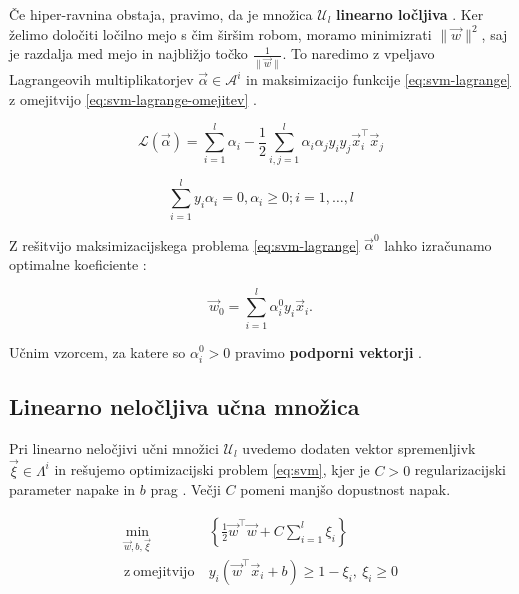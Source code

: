 Če hiper-ravnina obstaja, pravimo, da je množica $\mathcal{U}_l$ \textbf{linearno ločljiva} \cite{chapelle1999support}. Ker želimo določiti ločilno mejo s čim širšim robom, moramo minimizrati $\|\vec{w}\|^2$, saj je razdalja med mejo in najbližjo točko $\frac{1}{\|\vec{w}\|}$. To naredimo z vpeljavo Lagrangeovih multiplikatorjev $\vec{\alpha} \in \mathcal{A}^i$ in maksimizacijo funkcije \eqref{eq:svm-lagrange} z omejitvijo \eqref{eq:svm-lagrange-omejitev} \cite{chapelle1999support}.

\begin{equation}\label{eq:svm-lagrange}
	\mathcal{L}(\vec{\alpha}) = \sum_{i=1}^l \alpha_i - \frac{1}{2}\sum_{i,j=1}^l \alpha_i\alpha_j y_i y_j \vec{x}_i^\top\vec{x}_j
\end{equation}

\begin{equation}\label{eq:svm-lagrange-omejitev}
	\sum_{i=1}^ly_i\alpha_i = 0, \alpha_i \geq 0; i=1, \ldots, l
\end{equation}

Z rešitvijo maksimizacijskega problema \eqref{eq:svm-lagrange} $\vec{\alpha}^0$ lahko izračunamo optimalne koeficiente \cite{chapelle1999support}:

\begin{equation}
	\vec{w}_0 = \sum_{i=1}^l \alpha_i^0 y_i \vec{x}_i.
\end{equation}

Učnim vzorcem, za katere so $\alpha_i^0 > 0$ pravimo \textbf{podporni vektorji} \cite{chapelle1999support}.









\subsection{Linearno neločljiva učna množica}
Pri linearno neločjivi učni množici $\mathcal{U}_l$ uvedemo dodaten vektor spremenljivk $\vec{\xi} \in \mathit{\Lambda}^i$ in rešujemo optimizacijski problem \eqref{eq:svm}, kjer je $C>0$ regularizacijski parameter napake in $b$ prag \cite{chapelle1999support}. Večji $C$ pomeni manjšo dopustnost napak. 

\begin{equation}\label{eq:svm}
\begin{aligned}
\min_{\vec{w}, b, \vec{\xi}} &~ \left\{ \frac{1}{2} \vec{w}^\top\vec{w} + C \sum_{i=1}^l\xi_i \right\}\\
    \mathrm{z~omejitvijo} &~ y_i \left( \vec{w}^\top \vec{x}_i + b \right) \geq 1 - \xi_i,~ 
    \xi_i \geq 0
\end{aligned}	
\end{equation}








